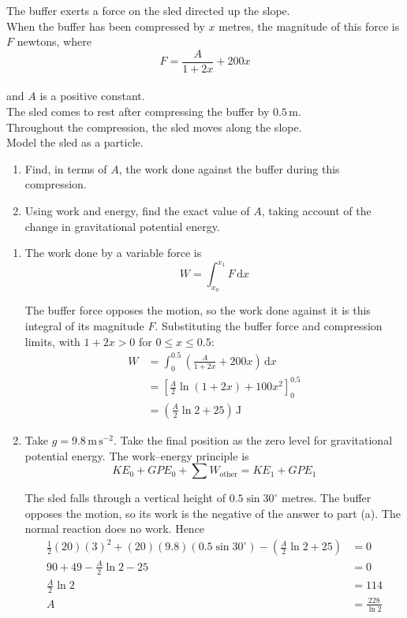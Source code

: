 \documentclass[leqno]{article}
\begin{document}
\begin{enumerate}[
  label=\textbf{\arabic*.},
  leftmargin=*,
  topsep=0pt,
  partopsep=0pt,
  parsep=0pt
]
The buffer exerts a force on the sled directed up the slope. \\
When the buffer has been compressed by $x$ metres, the magnitude of this force is $F$ newtons, where
\[
F=\frac{A}{1+2x}+200x
\] \\
and $A$ is a positive constant. \\
The sled comes to rest after compressing the buffer by $0.5\,\mathrm{m}$. \\
Throughout the compression, the sled moves along the slope. \\
Model the sled as a particle. \\

\begin{enumerate}[label=\textbf{(\alph*)}]
  \item Find, in terms of $A$, the work done against the buffer during this compression.  \\
  \item Using work and energy, find the exact value of $A$, taking account of the change in gravitational potential energy.  \\
\end{enumerate}

\vspace*{10pt}

\begin{djsSolution}
\begin{enumerate}[label=\textbf{(\alph*)}, start=1]
\item The work done by a variable force is
\[
W=\int_{x_0}^{x_1}F\,\mathrm{d}x
\]

The buffer force opposes the motion, so the work done against it is this integral of its magnitude \(F\). Substituting the buffer force and compression limits, with \(1+2x>0\) for \(0\leq x\leq0.5\):
\begin{align*}
W&=\int_0^{0.5}\left(\frac{A}{1+2x}+200x\right)\,\mathrm{d}x\\
&=\left[\frac{A}{2}\ln(1+2x)+100x^2\right]_0^{0.5}\\
&=\left(\frac{A}{2}\ln 2+25\right)\,\mathrm{J}
\end{align*}

\item Take \(g=9.8\,\mathrm{m\,s^{-2}}\). Take the final position as the zero level for gravitational potential energy. The work--energy principle is
\[
KE_0+GPE_0+\sum W_{\text{other}}=KE_1+GPE_1
\]

The sled falls through a vertical height of \(0.5\sin30^\circ\) metres. The buffer opposes the motion, so its work is the negative of the answer to part (a). The normal reaction does no work. Hence
\begin{align*}
\frac12(20)(3)^2+(20)(9.8)(0.5\sin30^\circ)-\left(\frac{A}{2}\ln2+25\right)&=0\\
90+49-\frac{A}{2}\ln2-25&=0\\
\frac{A}{2}\ln2&=114\\
A&=\frac{228}{\ln2}
\end{align*}


\end{enumerate}
\end{djsSolution}
\end{enumerate}
\end{document}
